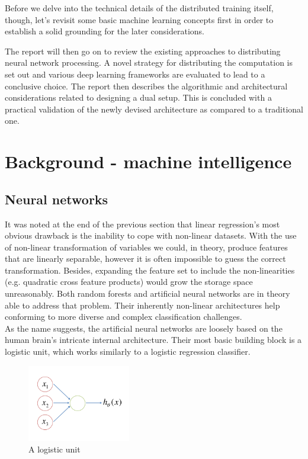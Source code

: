 \documentclass[a4paper, 12pt]{article}
\numberwithin{equation}{section}
\begin{document}
	 Before we delve into the technical details of the distributed training itself, though, let's revisit some basic machine learning concepts first in order to establish a solid grounding for the later considerations. 
	 
	 The report will then go on to review the existing approaches to distributing neural network processing. A novel strategy for distributing the computation is set out and various deep learning frameworks are evaluated to lead to a conclusive choice. The report then describes the algorithmic and architectural considerations related to designing a dual setup. This is concluded with a practical validation of the newly devised architecture as compared to a traditional one.

	\section{Background - machine intelligence}

	\subsection{Neural networks}

	\cite{ng2015coursera} It was noted at the end of the previous section that linear regression's most obvious drawback is the inability to cope with non-linear datasets. With the use of non-linear transformation of variables we could, in theory, produce features that are linearly separable, however it is often impossible to guess the correct transformation. Besides, expanding the feature set to include the non-linearities (e.g. quadratic cross feature products) would grow the storage space unreasonably. Both random forests and artificial neural networks are in theory able to address that problem. Their inherently non-linear architectures help conforming to more diverse and complex classification challenges. \\

	As the name suggests, the artificial neural networks are loosely based on the human brain's intricate internal architecture. Their most basic building block is a logistic unit, which works similarly to a logistic regression classifier.

	\begin{figure}[!h]
		\centering
		\includegraphics[page=1,width=0.40\textwidth]{logistic_unit.pdf}
		\caption{\label{fig:logistic_unit}{A logistic unit}}
	\end{figure}
\end{document}
